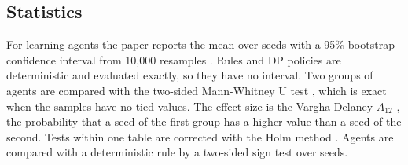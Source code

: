\subsection{Statistics}
For learning agents the paper reports the mean over seeds with a 95\% bootstrap confidence interval from 10,000 resamples \cite{efron1993}. Rules and DP policies are deterministic and evaluated exactly, so they have no interval. Two groups of agents are compared with the two-sided Mann-Whitney U test \cite{mann1947}, which is exact when the samples have no tied values. The effect size is the Vargha-Delaney $A_{12}$ \cite{vargha2000}, the probability that a seed of the first group has a higher value than a seed of the second. Tests within one table are corrected with the Holm method \cite{holm1979}. Agents are compared with a deterministic rule by a two-sided sign test over seeds.
